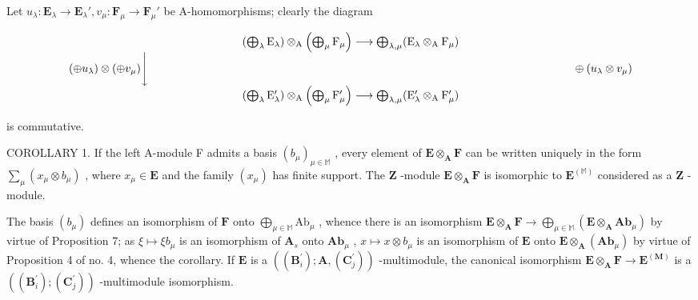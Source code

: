 Let \(u_{\lambda}: \mathbf{E}_{\lambda} \to \mathbf{E}_{\lambda}', v_{\mu}: \mathbf{F}_{\mu} \to \mathbf{F}_{\mu}'\) be A-homomorphisms; clearly the diagram

\[
\begin{array}{c} \left(\bigoplus_ {\lambda} \mathrm{E} _ {\lambda}\right) \otimes_ {\mathrm{A}} \left(\bigoplus_ {\mu} \mathrm{F} _ {\mu}\right) \longrightarrow \bigoplus_ {\lambda , \mu} (\mathrm{E} _ {\lambda} \otimes_ {\mathrm{A}} \mathrm{F} _ {\mu}) \\ (\oplus u _ {\lambda}) \otimes (\oplus v _ {\mu}) \Bigg \downarrow \qquad \qquad \qquad \qquad \qquad \qquad \qquad \qquad \qquad \qquad \qquad \qquad \qquad \qquad \qquad \qquad \qquad \qquad \qquad \oplus (u _ {\lambda} \otimes v _ {\mu}) \\ \left(\bigoplus_ {\lambda} \mathrm{E} _ {\lambda} ^ {\prime}\right) \otimes_ {\mathrm{A}} \left(\bigoplus_ {\mu} \mathrm{F} _ {\mu} ^ {\prime}\right) \longrightarrow \bigoplus_ {\lambda , \mu} (\mathrm{E} _ {\lambda} ^ {\prime} \otimes_ {\mathrm{A}} \mathrm{F} _ {\mu} ^ {\prime}) \end{array}
\]

is commutative.

COROLLARY 1. If the left A-module F admits a basis \((b_{\mu})_{\mu \in \mathbb{M}}\) , every element of \(\mathbf{E} \otimes_{\mathbf{A}} \mathbf{F}\) can be written uniquely in the form \(\sum_{\mu} (x_{\mu} \otimes b_{\mu})\) , where \(x_{\mu} \in \mathbf{E}\) and the family \((x_{\mu})\) has finite support. The \(\mathbf{Z}\) -module \(\mathbf{E} \otimes_{\mathbf{A}} \mathbf{F}\) is isomorphic to \(\mathbf{E}^{(\mathbb{M})}\) considered as a \(\mathbf{Z}\) -module.

The basis \((b_{\mu})\) defines an isomorphism of \(\mathbf{F}\) onto \(\bigoplus_{\mu \in \mathbb{M}}\mathrm{Ab}_{\mu}\) , whence there is an isomorphism \(\mathbf{E} \otimes_{\mathbf{A}}\mathbf{F} \to \bigoplus_{\mu \in \mathbb{M}}(\mathbf{E} \otimes_{\mathbf{A}}\mathbf{Ab}_{\mu})\) by virtue of Proposition 7; as \(\xi \mapsto \xi b_{\mu}\) is an isomorphism of \(\mathbf{A}_s\) onto \(\mathbf{Ab}_{\mu}\) , \(x \mapsto x \otimes b_{\mu}\) is an isomorphism of \(\mathbf{E}\) onto \(\mathbf{E} \otimes_{\mathbf{A}} (\mathbf{Ab}_{\mu})\) by virtue of Proposition 4 of no. 4, whence the corollary. If \(\mathbf{E}\) is a \(((\mathbf{B}_i^{\prime}); \mathbf{A}, (\mathbf{C}_j^{\prime}))\) -multimodule, the canonical isomorphism \(\mathbf{E} \otimes_{\mathbf{A}} \mathbf{F} \to \mathbf{E}^{(\mathbf{M})}\) is a \(((\mathbf{B}_i^{\prime}); (\mathbf{C}_j^{\prime}))\) -multimodule isomorphism.

